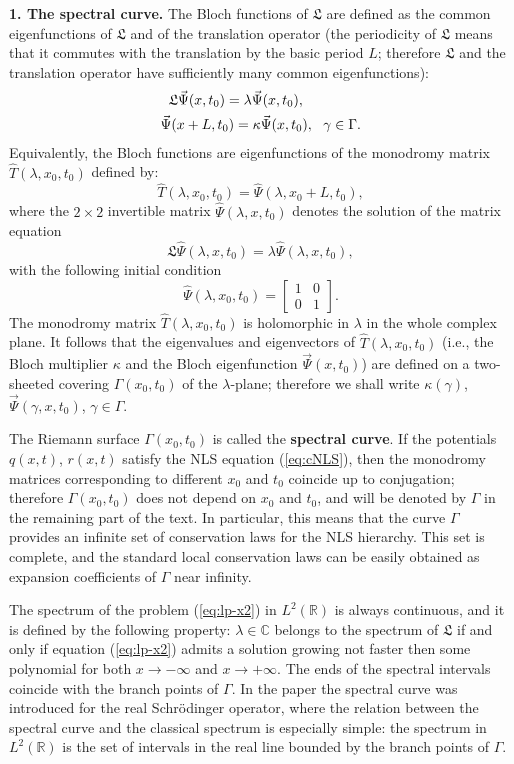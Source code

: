 \documentclass[12pt]{article}
\newcommand{\RR}{\mathbb R}
\newcommand{\CC}{\mathbb C}
\newcommand{\LG}{\mathfrak L}
\begin{document}
\textbf{1. The spectral curve.} The Bloch functions of $\LG$ are defined as the common eigenfunctions of  $\LG$ and of the translation operator (the periodicity of  $\LG$ means that it commutes with the translation by the basic period $L$; therefore $\LG$ and the translation operator have sufficiently many common eigenfunctions):
\begin{eqnarray}
\label{eq:bloch1}
\LG  \vec\Psi(x,t_0) =\lambda \vec\Psi(x,t_0),\hphantom{aaa\gamma \in \Gamma}\nonumber\\
\vec\Psi(x+L,t_0)=\kappa \vec\Psi(x,t_0), \ \ \gamma \in \Gamma .
\end{eqnarray}
Equivalently, the Bloch functions are eigenfunctions of the monodromy matrix  $\hat T(\lambda,x_0,t_0)$ defined by:
$$
\hat T(\lambda,x_0,t_0)=\hat\Psi(\lambda,x_0+L,t_0),
$$
where  the $2\times2$ invertible matrix $\hat\Psi(\lambda,x,t_0)$ denotes the solution of the matrix equation 
$$
\LG\hat\Psi(\lambda,x,t_0)=\lambda\hat\Psi(\lambda,x,t_0),
$$
with the following initial condition
$$
\hat\Psi(\lambda,x_0,t_0)=\left [\begin {array}{cc} 1 & 0
\\ 0 & 1 \end {array}\right].
$$
The monodromy matrix $\hat T(\lambda,x_0,t_0)$ is holomorphic in $\lambda$ in the whole complex plane. It follows that the eigenvalues and eigenvectors of $\hat T(\lambda,x_0,t_0)$ (i.e., the Bloch multiplier $\kappa$ and the Bloch eigenfunction $\vec\Psi(x,t_0)$) are defined on a two-sheeted covering $\Gamma(x_0,t_0)$ of the $\lambda$-plane; therefore we shall write $\kappa(\gamma)$,  $\vec\Psi(\gamma,x,t_0)$, $\gamma\in\Gamma$. 

The Riemann surface $\Gamma(x_0,t_0)$ is called the \textbf{spectral curve}. If the potentials $q(x,t)$, $r(x,t)$ satisfy the NLS equation (\ref{eq:cNLS}), then the monodromy matrices corresponding to different $x_0$ and $t_0$ coincide up to conjugation; therefore $\Gamma(x_0,t_0)$ does not depend on $x_0$ and $t_0$, and will be denoted by $\Gamma$ in the remaining part of the text. In particular, this means that the curve $\Gamma$ provides an infinite set of conservation laws for the NLS hierarchy. This set is complete, and the standard local conservation laws can be easily obtained as expansion coefficients of $\Gamma$ near infinity. 

The spectrum  of the problem (\ref{eq:lp-x2}) in $L^2(\RR)$ is always continuous, and it is defined by the following property: $\lambda\in\CC$ belongs to the spectrum of $\LG$ if and only if equation (\ref{eq:lp-x2}) admits a solution growing not faster then some polynomial for both $x\rightarrow -\infty$ and $x\rightarrow +\infty$. The ends of the spectral intervals coincide with the branch points of $\Gamma$. In the paper \cite{Novikov} the spectral curve was introduced for the real Schr\"odinger operator, where the relation between the spectral curve and the classical spectrum is especially simple: the spectrum in $L^2(\RR)$ is the set of intervals in the real line bounded by the branch points of  $\Gamma$.
\end{document}
